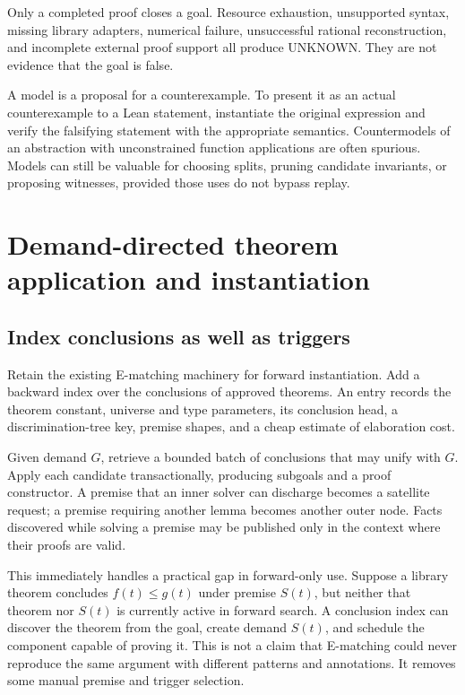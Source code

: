 \documentclass[11pt,a4paper]{article}
\newcommand{\unknown}{\textnormal{UNKNOWN}}
\begin{document}
Only a completed proof closes a goal. Resource exhaustion, unsupported syntax, missing library adapters, numerical failure, unsuccessful rational reconstruction, and incomplete external proof support all produce \unknown. They are not evidence that the goal is false.

A model is a proposal for a counterexample. To present it as an actual counterexample to a Lean statement, instantiate the original expression and verify the falsifying statement with the appropriate semantics. Countermodels of an abstraction with unconstrained function applications are often spurious. Models can still be valuable for choosing splits, pruning candidate invariants, or proposing witnesses, provided those uses do not bypass replay.

\section{Demand-directed theorem application and instantiation}
\label{sec:demand}

\subsection{Index conclusions as well as triggers}

Retain the existing E-matching machinery for forward instantiation. Add a backward index over the conclusions of approved theorems. An entry records the theorem constant, universe and type parameters, its conclusion head, a discrimination-tree key, premise shapes, and a cheap estimate of elaboration cost.

Given demand $G$, retrieve a bounded batch of conclusions that may unify with $G$. Apply each candidate transactionally, producing subgoals and a proof constructor. A premise that an inner solver can discharge becomes a satellite request; a premise requiring another lemma becomes another outer node. Facts discovered while solving a premise may be published only in the context where their proofs are valid.

This immediately handles a practical gap in forward-only use. Suppose a library theorem concludes $f(t)\leq g(t)$ under premise $S(t)$, but neither that theorem nor $S(t)$ is currently active in forward search. A conclusion index can discover the theorem from the goal, create demand $S(t)$, and schedule the component capable of proving it. This is not a claim that E-matching could never reproduce the same argument with different patterns and annotations. It removes some manual premise and trigger selection.
\end{document}
